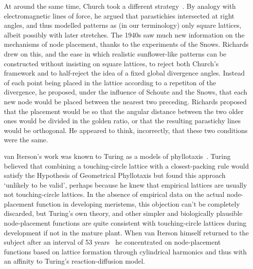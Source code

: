 At around the same time, Church took a different strategy~\cite{churchRelationPhyllotaxisMechanical1904}. By analogy with electromagnetic lines of force, he argued that parastichies intersected at right angles,  and thus modelled patterns as (in our terminology) only square lattices, albeit possibly with later stretches. 
The 1940s saw much new information on the mechanisms of node placement, thanks to the experiments of the Snows. Richards drew on this, and the ease in which realistic sunflower-like patterns can be constructed without insisting on square lattices, to reject both Church's framework and to half-reject the idea of  a fixed global divergence angles.
Instead of each point being placed in the lattice according to a repetiton of the divergence, he proposed, under the influence of Schoute and the Snows, that each new node would be placed between the nearest two preceding.
%
Richards proposed that the placement would be so that the angular distance between the two older ones would be divided in the golden ratio, or that the resulting parastichy lines would be orthogonal. He appeared to think, incorrectly, that these two conditions were the same. 

van Iterson's work was known to Turing as a models of phyllotaxis~\cite[Section 14]{turingMorphogenTheoryPhyllotaxis2013}. Turing believed that combining a touching-circle lattice with a closest-packing rule would satisfy the Hypothesis of Geometrical Phyllotaxis but found this approach `unlikely to be valid', perhaps because he knew that empirical lattices are usually not  touching-circle lattices.  In the absence of empirical data on the actual node-placement function in developing meristems, this objection can't be completely discarded, but Turing's own theory, and other simpler and biologically plausible node-placement functions are quite consistent with touching-circle lattices during development if not in the mature plant. When van Iterson himself returned to the subject after an interval of 53 years~\autocite{vanitersonjrNewStudiesPhyllotaxis1960} he concentrated on node-placement functions based on lattice formation through cylindrical harmonics and thus with an affinity to Turing's reaction-diffusion model. 

